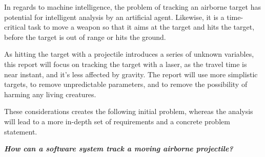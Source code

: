 In regards to machine intelligence, the problem of tracking an airborne target has potential for intelligent analysis by an artificial agent.
Likewise, it is a time-critical task to move a weapon so that it aims at the target and hits the target, before the target is out of range or hits the ground.

As hitting the target with a projectile introduces a series of unknown variables, this report will focus on tracking the target with a laser, as the travel time is near instant, and it's less affected by gravity.
The report will use more simplistic targets, to remove unpredictable parameters, and to remove the possibility of harming any living creatures.

These considerations creates the following initial problem, whereas the analysis will lead to a more in-depth set of requirements and a concrete problem statement.
\begin{center}
  \textit{\textbf{How can a software system track a moving airborne projectile?}}
\end{center}
